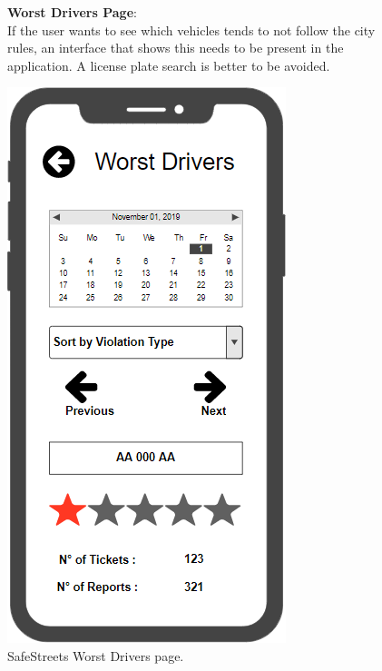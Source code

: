 \begin{figure}
	\begin{flushleft}
		\textbf{Worst Drivers Page}:\\
		If the user wants to see which vehicles tends to not follow the city rules, an interface that shows this needs to be present in the application. A license plate search is better to be avoided.
	\end{flushleft}
	\centering
	\includegraphics[width=0.6\linewidth]{images/mockups/vehicles}
	\caption{SafeStreets Worst Drivers page.}
	\label{fig:vehicles}
\end{figure}
\clearpage
